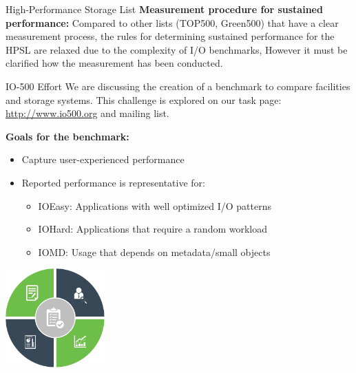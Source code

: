 \documentclass[portrait,a0paper,fontscale=0.4]{baposter}
\begin{document}
\begin{poster}
\begin{posterbox}[name=schedule,column=1,span=2, below=concept]{High-Performance Storage List}
\textbf{Measurement procedure for sustained performance:}
Compared to other lists (TOP500, Green500) that have a clear measurement process, the rules for determining sustained performance for the HPSL are relaxed due to the complexity of I/O benchmarks, However it must be clarified how the measurement has been conducted.
\end{posterbox}

\begin{posterbox}[name=HHCC,column=1,span=2, below=schedule, above=bottom]{IO-500 Effort}
We are discussing the creation of a benchmark to compare facilities and storage systems. This challenge is explored on our task page: \url{http://www.io500.org} and mailing list.

\textbf{Goals for the benchmark:}

\vspace*{-0.5em}

\begin{minipage}{10.5cm}
\begin{itemize}
\item Capture user-experienced performance %
\item Reported performance is representative for:
\vspace*{-0.5em}
\begin{itemize}
\item IOEasy: Applications with well optimized I/O patterns
\item IOHard: Applications that require a random workload
\item IOMD: Usage that depends on metadata/small objects
\end{itemize}
\end{itemize}
\end{minipage}
\qquad
\begin{minipage}{4cm}
\includegraphics[width=3.8cm]{border}
\end{minipage}

\vspace*{-1em}


\end{posterbox}
\end{poster}
\end{document}
